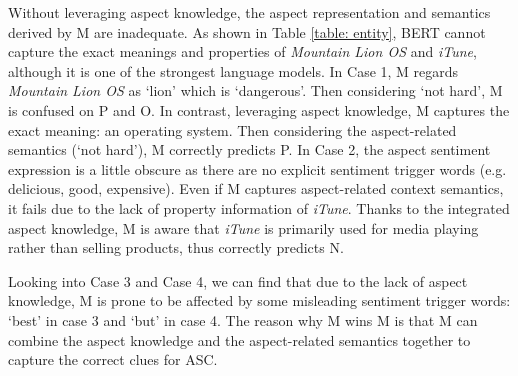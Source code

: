 Without leveraging aspect knowledge, the aspect representation and semantics derived by M are inadequate. 
As shown in Table \ref{table: entity}, BERT cannot capture the exact meanings and properties of \textit{Mountain Lion OS} and \textit{iTune}, although it is one of the strongest language models. 
In Case 1, M regards \textit{Mountain Lion OS} as `lion' which is `dangerous'. Then considering `not hard', M is confused on P and O.
In contrast, leveraging aspect knowledge, M captures the exact meaning: an operating system.
Then considering the aspect-related semantics (`not hard'), M correctly predicts P.
In Case 2, the aspect sentiment expression is a little obscure as there are no explicit sentiment trigger words (e.g. delicious, good, expensive).
Even if M captures aspect-related context semantics, it fails due to the lack of property information of \textit{iTune}.
Thanks to the integrated aspect knowledge, M is aware that \textit{iTune} is primarily used for media playing rather than selling products, thus correctly predicts N.



Looking into Case 3 and Case 4, we can find that due to the lack of aspect knowledge, M is prone to be affected by some misleading sentiment trigger words: `best' in case 3 and `but' in case 4.
The reason why M wins M is that M can combine the aspect knowledge and the aspect-related semantics together to capture the correct clues for ASC.
\begin{table}[t]
\fontsize{8}{10}\selectfont
\centering
\caption{Misunderstanding from BERT presented by semantic cosine similarity ().  is the average of entity's hidden states.
  denotes the  in case .}
\label{table: entity}
\end{table}

